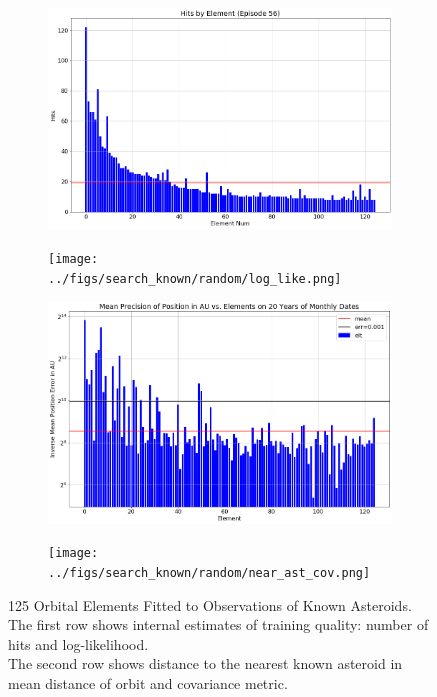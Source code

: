 \begin{figure}[h]
\begin{subfigure}[t]{\subfigwidth\textwidth}
\centering
\includegraphics[width=1.0\textwidth]{../figs/search_known/random/hits.png}
\end{subfigure}
\hfill
\begin{subfigure}[t]{\subfigwidth\textwidth}
\centering
\texttt{[image: ../figs/search\_known/random/log\_like.png]}
\end{subfigure}
\medskip
\begin{subfigure}[t]{\subfigwidth\textwidth}
\centering
\includegraphics[width=1.0\textwidth]{../figs/search_known/random/near_ast_dist.png}
\end{subfigure}
\hfill
\begin{subfigure}[t]{\subfigwidth\textwidth}
\centering
\texttt{[image: ../figs/search\_known/random/near\_ast\_cov.png]}
\end{subfigure}
\caption[125 Orbital Elements Fitted to Observations of Known Asteroids]
{125 Orbital Elements Fitted to Observations of Known Asteroids.\\
The first row shows internal estimates of training quality: number of hits and log-likelihood.\\
The second row shows distance to the nearest known asteroid in mean distance of orbit and covariance metric.}
\label{fig:TrainRandomKnown}
\end{figure}

